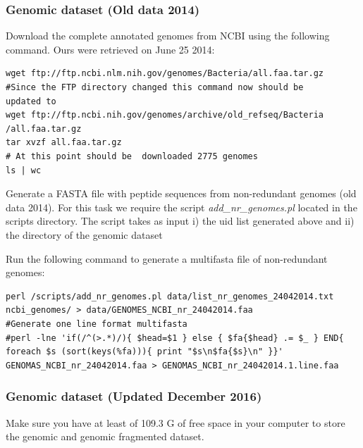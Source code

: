 \documentclass[12pt]{report}
\begin{document}
\subsubsection{Genomic dataset (Old data 2014)}
Download the complete  annotated genomes from NCBI using the following command.
Ours were retrieved on June 25 2014:  

\begin{verbatim}
wget ftp://ftp.ncbi.nlm.nih.gov/genomes/Bacteria/all.faa.tar.gz
#Since the FTP directory changed this command now should be 
updated to
wget ftp://ftp.ncbi.nih.gov/genomes/archive/old_refseq/Bacteria
/all.faa.tar.gz
tar xvzf all.faa.tar.gz
# At this point should be  downloaded 2775 genomes
ls | wc 
\end{verbatim}

Generate a FASTA file with peptide sequences from non-redundant genomes (old
data 2014). 
For this task we require the script  \textit{add\_nr\_genomes.pl} located in
the scripts directory.
The script takes as input i) the uid list generated above and ii) the directory
of the genomic dataset 

Run the following command to generate a multifasta file of non-redundant
genomes:
\begin{verbatim}
perl /scripts/add_nr_genomes.pl data/list_nr_genomes_24042014.txt 
ncbi_genomes/ > data/GENOMES_NCBI_nr_24042014.faa
#Generate one line format multifasta 
#perl -lne 'if(/^(>.*)/){ $head=$1 } else { $fa{$head} .= $_ } END{ 
foreach $s (sort(keys(%fa))){ print "$s\n$fa{$s}\n" }}' 
GENOMAS_NCBI_nr_24042014.faa > GENOMAS_NCBI_nr_24042014.1.line.faa
\end{verbatim}

\subsubsection{Genomic dataset (Updated December 2016) }

Make sure you have at least of 109.3 G of free space in your computer to store
the genomic and genomic fragmented dataset. 
\end{document}
